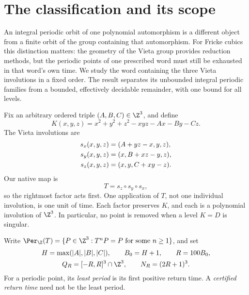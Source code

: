 \section{The classification and its scope}\label{sec:introduction}

An integral periodic orbit of one polynomial automorphism is a different
object from a finite orbit of the group containing that automorphism.
For Fricke cubics this distinction matters: the geometry of the Vieta
group provides reduction methods, but the periodic points of one
prescribed word must still be exhausted in that word's own time.
We study the word containing the three Vieta involutions in a fixed order.
The result separates its unbounded integral periodic families from a
bounded, effectively decidable remainder, with one bound for all levels.

Fix an arbitrary ordered triple \((A,B,C)\in\Z^3\), and define
\begin{equation}\label{eq:invariant}
 K(x,y,z)=x^2+y^2+z^2-xyz-Ax-By-Cz.
\end{equation}
The Vieta involutions are
\begin{align}
 s_x(x,y,z)&=(A+yz-x,y,z),\notag\\
 s_y(x,y,z)&=(x,B+xz-y,z),\label{eq:involutions}\\
 s_z(x,y,z)&=(x,y,C+xy-z).\notag
\end{align}
Our native map is
\begin{equation}\label{eq:native}
 T=s_z\circ s_y\circ s_x,
\end{equation}
so the rightmost factor acts first. One application of \(T\), not one
individual involution, is one unit of time. Each factor preserves
\(K\), and each is a polynomial involution of \(\Z^3\). In particular,
no point is removed when a level \(K=D\) is singular.

Write \(\Per_\Z(T)=\{P\in\Z^3:T^nP=P\text{ for some }n\ge1\}\), and set
\begin{equation}\label{eq:bounds}
 \begin{gathered}
 H=\max(|A|,|B|,|C|),\qquad B_0=H+1,\qquad R=100B_0,\\
 Q_R=[-R,R]^3\cap\Z^3,\qquad N_R=(2R+1)^3.
 \end{gathered}
\end{equation}
For a periodic point, its \emph{least period} is its first positive
return time. A \emph{certified return time} need not be the least period.

